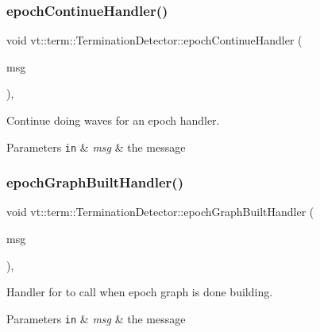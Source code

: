\subsubsection{\texorpdfstring{epoch\+Continue\+Handler()}{epochContinueHandler()}}
{\footnotesize\ttfamily void vt\+::term\+::\+Termination\+Detector\+::epoch\+Continue\+Handler (\begin{DoxyParamCaption}\item[{\hyperlink{structvt_1_1term_1_1_term_msg}{Term\+Msg} $\ast$}]{msg }\end{DoxyParamCaption})\hspace{0.3cm}{\ttfamily [static]}, {\ttfamily [private]}}



Continue doing waves for an epoch handler. 


\begin{DoxyParams}[1]{Parameters}
\mbox{\tt in}  & {\em msg} & the message \\
\hline
\end{DoxyParams}
\mbox{\label{structvt_1_1term_1_1_termination_detector_a5a8084f2dc7df36da7e78d088ae8cae9}} 
\subsubsection{\texorpdfstring{epoch\+Graph\+Built\+Handler()}{epochGraphBuiltHandler()}}
{\footnotesize\ttfamily void vt\+::term\+::\+Termination\+Detector\+::epoch\+Graph\+Built\+Handler (\begin{DoxyParamCaption}\item[{\hyperlink{structvt_1_1term_1_1_termination_detector_aec8abc5a3b161ac7df73ff3ba385dace}{Epoch\+Graph\+Msg} $\ast$}]{msg }\end{DoxyParamCaption})\hspace{0.3cm}{\ttfamily [static]}, {\ttfamily [private]}}



Handler for to call when epoch graph is done building. 


\begin{DoxyParams}[1]{Parameters}
\mbox{\tt in}  & {\em msg} & the message \\
\hline
\end{DoxyParams}
\mbox{\label{structvt_1_1term_1_1_termination_detector_a54a16b81d1c0717a4a7cd1adff5b146e}} 
